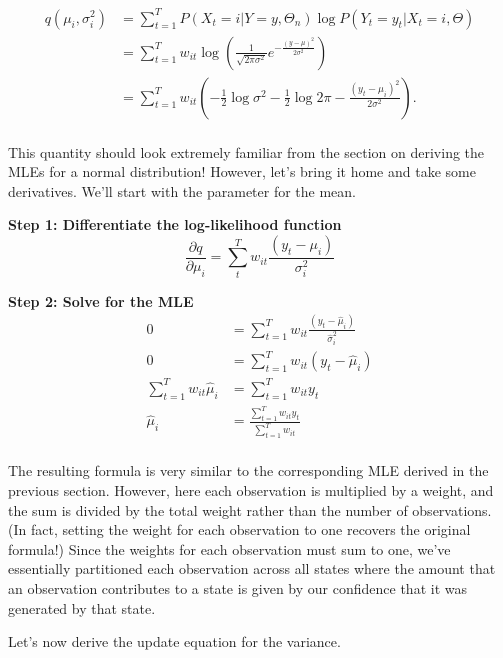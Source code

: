 \begin{align*}
q(\mu_i, \sigma_i^2)
&= \sum_{t=1}^T P(X_t=i|Y=y, \Theta_n) \log P(Y_t=y_t|X_t=i, \Theta) \\
&= \sum_{t=1}^T w_{it} \log \left(
                                  \frac{1}{\sqrt{2\pi\sigma^2}} e^{-\frac{\left( y-\mu \right)^2}{2\sigma^2}}
                             \right) \\
&= \sum_{t=1}^T w_{it} \left(
                             -\frac{1}{2}\log \sigma^2
                             -\frac{1}{2}\log 2\pi
                             -\frac{\left( y_t - \mu_i \right)^2}{2\sigma^2}
                       \right). \\
\end{align*}

This quantity should look extremely familiar from the section on deriving the MLEs for a normal distribution! However, let's bring it home and take some derivatives. We'll start with the parameter for the mean.

\textbf{Step 1: Differentiate the log-likelihood function}
\begin{equation*}
\frac{\partial q}{\partial \mu_i} = \sum_t^T w_{it} \frac{(y_t-\mu_i)}{\sigma_i^2}
\end{equation*}

\textbf{Step 2: Solve for the MLE}
\begin{align*}
0 &= \sum_{t=1}^T w_{it} \frac{(y_t-\hat{\mu}_i)}{\hat{\sigma}_i^2} \\
0 &= \sum_{t=1}^T w_{it} (y_t-\hat{\mu}_i) \\
\sum_{t=1}^T w_{it} \hat{\mu}_i &= \sum_{t=1}^T w_{it} y_t \\
\hat{\mu}_i &= \frac{\sum_{t=1}^T w_{it} y_t}{\sum_{t=1}^T w_{it}} \\
\end{align*}

The resulting formula is very similar to the corresponding MLE derived in the previous section. However, here each observation is multiplied by a weight, and the sum is divided by the total weight rather than the number of observations. (In fact, setting the weight for each observation to one recovers the original formula!) Since the weights for each observation must sum to one, we've essentially partitioned each observation across all states where the amount that an observation contributes to a state is given by our confidence that it was generated by that state.

Let's now derive the update equation for the variance.

